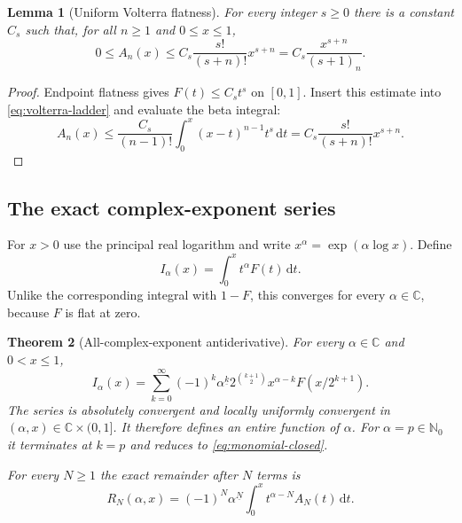 \documentclass[11pt,oneside]{article}
\numberwithin{equation}{section}
\newtheorem{theorem}{Theorem}[section]
\newtheorem{lemma}[theorem]{Lemma}
\theoremstyle{definition}
\theoremstyle{remark}
\newcommand{\C}{\mathbb C}
\newcommand{\N}{\mathbb N}
\newcommand{\dd}{\,\mathrm d}
\newcommand{\fall}[2]{#1^{\underline{#2}}}
\begin{document}
\begin{lemma}[Uniform Volterra flatness]
\label{lem:volterra-flatness}
For every integer $s\ge0$ there is a constant $C_s$ such that, for all
$n\ge1$ and $0\le x\le1$,
\begin{equation}
 0\le A_n(x)\le C_s\frac{s!}{(s+n)!}x^{s+n}
 =C_s\frac{x^{s+n}}{(s+1)_n}.                              \label{eq:An-flat-bound}
\end{equation}
\end{lemma}

\begin{proof}
Endpoint flatness gives $F(t)\le C_st^s$ on $[0,1]$.  Insert this estimate into
\eqref{eq:volterra-ladder} and evaluate the beta integral:
\[
 A_n(x)\le\frac{C_s}{(n-1)!}\int_0^x(x-t)^{n-1}t^s\dd t
 =C_s\frac{s!}{(s+n)!}x^{s+n}.
\]
\end{proof}

\subsection{The exact complex-exponent series}
For $x>0$ use the principal real logarithm and write $x^\alpha=
\exp(\alpha\log x)$.  Define
\begin{equation}
 I_\alpha(x)=\int_0^xt^\alpha F(t)\dd t.                  \label{eq:Ialpha-def}
\end{equation}
Unlike the corresponding integral with $1-F$, this converges for every
$\alpha\in\C$, because $F$ is flat at zero.

\begin{theorem}[All-complex-exponent antiderivative]
\label{thm:complex-series}
For every $\alpha\in\C$ and $0<x\le1$,
\begin{equation}
 \boxed{
 I_\alpha(x)=\sum_{k=0}^{\infty}(-1)^k\fall{\alpha}{k}
 2^{\binom{k+1}{2}}x^{\alpha-k}F(x/2^{k+1}).}              \label{eq:complex-series}
\end{equation}
The series is absolutely convergent and locally uniformly convergent in
$(\alpha,x)\in\C\times(0,1]$.  It therefore defines an entire function of
$\alpha$.  For $\alpha=p\in\N_0$ it terminates at $k=p$ and reduces to
\eqref{eq:monomial-closed}.

For every $N\ge1$ the exact remainder after $N$ terms is
\begin{equation}
 R_N(\alpha,x)=(-1)^N\fall{\alpha}{N}
 \int_0^xt^{\alpha-N}A_N(t)\dd t.                          \label{eq:complex-remainder}
\end{equation}
\end{theorem}
\end{document}
